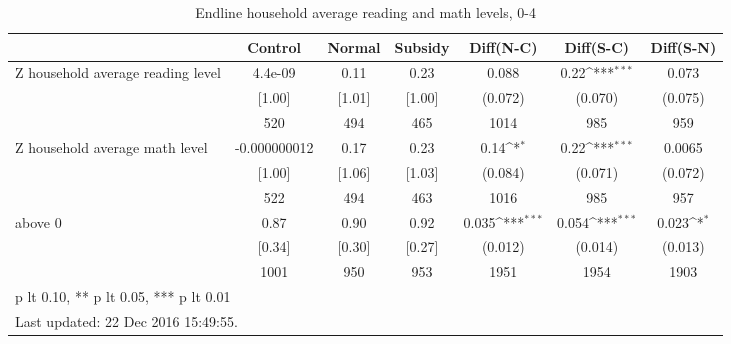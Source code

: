 \begin{table}[htbp]\centering
\def\sym#1{\ifmmode^{#1}\else\(^{#1}\)\fi}
\caption{Endline household average reading and math levels, 0-4 \label{tab:"balance"}}
\begin{tabular*}{1\hsize}{@{\hskip\tabcolsep\extracolsep\fill}l*{1}{cccccc}}
\toprule
                                &  Control&   Normal&  Subsidy&Diff(N-C)         &Diff(S-C)         &Diff(S-N)         \\
\midrule
Z household average reading level&  4.4e-09&     0.11&     0.23&    0.088         &     0.22\sym{***}&    0.073         \\
                                &   [1.00]&   [1.01]&   [1.00]&  (0.072)         &  (0.070)         &  (0.075)         \\
                                &      520&      494&      465&     1014         &      985         &      959         \\
Z household average math level  &-0.000000012&     0.17&     0.23&     0.14\sym{*}  &     0.22\sym{***}&   0.0065         \\
                                &   [1.00]&   [1.06]&   [1.03]&  (0.084)         &  (0.071)         &  (0.072)         \\
                                &      522&      494&      463&     1016         &      985         &      957         \\
above 0                         &     0.87&     0.90&     0.92&    0.035\sym{***}&    0.054\sym{***}&    0.023\sym{*}  \\
                                &   [0.34]&   [0.30]&   [0.27]&  (0.012)         &  (0.014)         &  (0.013)         \\
                                &     1001&      950&      953&     1951         &     1954         &     1903         \\
\bottomrule
\multicolumn{7}{l}{\footnotesize * p lt 0.10, ** p lt 0.05, *** p lt 0.01}\\
\multicolumn{7}{l}{\footnotesize Last updated: 22 Dec 2016 15:49:55.}\\
\end{tabular*}
\end{table}

